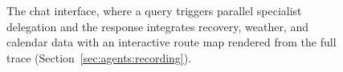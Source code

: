 \begin{figure}[ht]
\centering
{}
\caption[Chat interface]{The chat interface, where a query triggers parallel specialist delegation and the response integrates recovery, weather, and calendar data with an interactive route map rendered from the full trace (Section~\ref{sec:agents:recording}).}\label{fig:screenshot_chat}
\end{figure}

